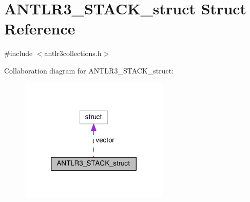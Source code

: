 \hypertarget{struct_a_n_t_l_r3___s_t_a_c_k__struct}{\section{A\-N\-T\-L\-R3\-\_\-\-S\-T\-A\-C\-K\-\_\-struct Struct Reference}
\label{struct_a_n_t_l_r3___s_t_a_c_k__struct}
}


{\ttfamily \#include $<$antlr3collections.\-h$>$}



Collaboration diagram for A\-N\-T\-L\-R3\-\_\-\-S\-T\-A\-C\-K\-\_\-struct\-:
\nopagebreak
\begin{figure}[H]
\begin{center}
\leavevmode
\includegraphics[width=202pt]{struct_a_n_t_l_r3___s_t_a_c_k__struct__coll__graph}
\end{center}
\end{figure}
